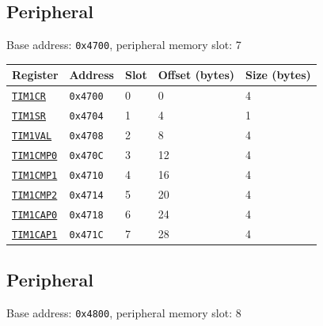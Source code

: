 \subsection{ Peripheral}
\noindent Base address: \texttt{0x4700}, peripheral memory slot: 7

\begin{tabularx}{\textwidth}{ l l l l X }
\textbf{Register} & \textbf{Address} & \textbf{Slot} & \textbf{Offset (bytes)} & \textbf{Size (bytes)} \\ \hline
\hyperref[ss:TIMxCR]{\texttt{TIM1CR}} & \texttt{0x4700} & 0 & 0 & 4 \\
\rowcolor{tablehighlightcolor} \hyperref[ss:TIMxSR]{\texttt{TIM1SR}} & \texttt{0x4704} & 1 & 4 & 1 \\
\hyperref[ss:TIMxVAL]{\texttt{TIM1VAL}} & \texttt{0x4708} & 2 & 8 & 4 \\
\rowcolor{tablehighlightcolor} \hyperref[ss:TIMxCMP0]{\texttt{TIM1CMP0}} & \texttt{0x470C} & 3 & 12 & 4 \\
\hyperref[ss:TIMxCMP1]{\texttt{TIM1CMP1}} & \texttt{0x4710} & 4 & 16 & 4 \\
\rowcolor{tablehighlightcolor} \hyperref[ss:TIMxCMP2]{\texttt{TIM1CMP2}} & \texttt{0x4714} & 5 & 20 & 4 \\
\hyperref[ss:TIMxCAP0]{\texttt{TIM1CAP0}} & \texttt{0x4718} & 6 & 24 & 4 \\
\rowcolor{tablehighlightcolor} \hyperref[ss:TIMxCAP1]{\texttt{TIM1CAP1}} & \texttt{0x471C} & 7 & 28 & 4 \\
\hline
\end{tabularx}

\subsection{ Peripheral}
\noindent Base address: \texttt{0x4800}, peripheral memory slot: 8


